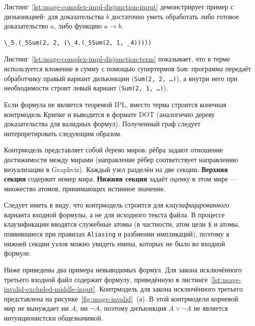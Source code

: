 \documentclass[14pt, russian]{scrartcl}
\begin{document}
Листинг~\ref{lst:usage-complex-impl-disjunction-input} демонстрирует пример с
дизъюнкцией: для доказательства $b$ достаточно уметь обработать либо готовое
доказательство $a$, либо функцию $a \rightarrow b$.

\begin{listing}[!htb]
\caption{Редуцированный терм для \texttt{complex-impl-disjunction.txt}}
\label{lst:usage-complex-impl-disjunction-term}
\begin{verbatim}
\_5.(_5Sum(2, 2, (\_4.(_5Sum(2, 1, _4)))))
\end{verbatim}
\end{listing}

Листинг~\ref{lst:usage-complex-impl-disjunction-term} показывает, что в терме
используется вложение в сумму с помощью супертермов \texttt{Sum}: программа
передаёт обработчику правый вариант дизъюнкции (\texttt{Sum(2, 2, \ldots)}),
а внутри него при необходимости строит левый вариант (\texttt{Sum(2, 1, \ldots)}).

Если формула не является теоремой IPL, вместо терма строится конечная
контрмодель Крипке и выводится в формате DOT (аналогично дереву доказательства
для валидных формул). Полученный граф следует интерпретировать следующим
образом.

Контрмодель представляет собой \emph{дерево} миров: рёбра задают отношение
достижимости между мирами (направление рёбер соответствует направлению
визуализации в Graphviz). Каждый узел разделён на две секции. \textbf{Верхняя
секция} содержит номер мира. \textbf{Нижняя секция} задаёт \emph{оценку} в
этом мире --- множество атомов, принимающих истинное значение.

Следует иметь в виду, что контрмодель строится для \emph{клаузифицированного}
варианта входной формулы, а не для исходного текста файла. В процессе
клаузификации вводятся служебные атомы (в частности, атом цели \texttt{\$} и
атомы, появившиеся при правилах \texttt{Aliasing} и разбиении импликаций),
поэтому в нижней секции узлов можно увидеть имена, которых не было во входной
формуле.

Ниже приведены два примера невыводимых формул. Для закона исключённого третьего
входной файл содержит формулу, приведённую в
листинге~\ref{lst:usage-invalid-excluded-middle-input}. Контрмодель для закона
исключённого третьего представлена на
рисунке~\ref{fig:usage-invalid}~(а). В этой контрмодели корневой мир не вынуждает ни $A$, ни $\neg A$, поэтому дизъюнкция $A \lor \neg A$ не является интуиционистски общезначимой.
\end{document}
